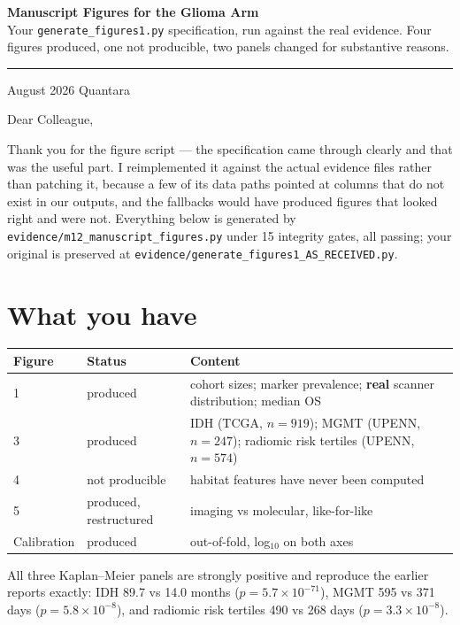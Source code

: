\documentclass[11pt,a4paper]{article}
\begin{document}
\thispagestyle{empty}
\noindent
{\large\bfseries\color{qnavy} Manuscript Figures for the Glioma Arm}\\[2pt]
{\color{qgrey}Your \texttt{generate\_figures1.py} specification, run against the real evidence.
Four figures produced, one not producible, two panels changed for substantive reasons.}\\[6pt]
{\color{qgrey}\rule{\textwidth}{0.4pt}}

\medskip
{} August 2026 \quad\textbullet\quad Quantara

\bigskip
\noindent Dear Colleague,

\medskip

Thank you for the figure script --- the specification came through clearly and that was the
useful part. I reimplemented it against the actual evidence files rather than patching it,
because a few of its data paths pointed at columns that do not exist in our outputs, and the
fallbacks would have produced figures that looked right and were not. Everything below is
generated by \texttt{evidence/m12\_manuscript\_figures.py} under 15 integrity gates, all
passing; your original is preserved at
\texttt{evidence/generate\_figures1\_AS\_RECEIVED.py}.

\section{What you have}

\begin{center}
\begin{tabular}{@{}llp{7.4cm}@{}}
\toprule
\textbf{Figure} & \textbf{Status} & \textbf{Content} \\
\midrule
1 & produced & cohort sizes; marker prevalence; \textbf{real} scanner distribution; median OS \\
3 & produced & IDH (TCGA, $n{=}919$); MGMT (UPENN, $n{=}247$); radiomic risk tertiles
              (UPENN, $n{=}574$) \\
4 & \textcolor{qred}{not producible} & habitat features have never been computed \\
5 & produced, \textcolor{qred}{restructured} & imaging vs molecular, like-for-like \\
Calibration & produced & out-of-fold, log$_{10}$ on both axes \\
\bottomrule
\end{tabular}
\end{center}

All three Kaplan--Meier panels are strongly positive and reproduce the earlier reports exactly:
IDH 89.7 vs 14.0 months ($p = 5.7\times10^{-71}$), MGMT 595 vs 371 days
($p = 5.8\times10^{-8}$), and radiomic risk tertiles 490 vs 268 days
($p = 3.3\times10^{-8}$).
\end{document}
